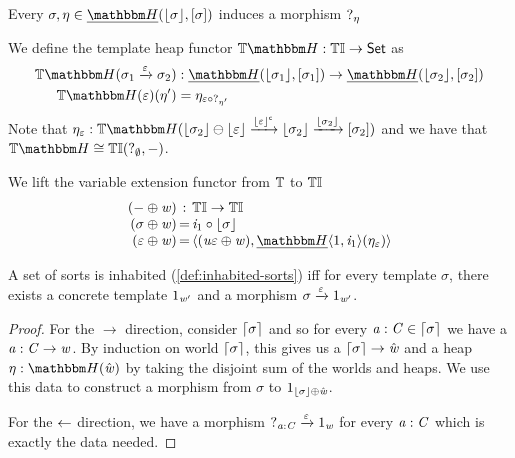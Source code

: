 \begin{remark}
    Every $\sigma, \mvarM \in \dheapF(\concL\sigma, \anyL\sigma)$ induces a morphism $?_\eta$
    \begin{center}
    \end{center}
\end{remark}

\begin{definition}
We define the template heap functor $\theapF : \tinstC \to \setC$ as
\begin{align*}
    \theapF(\sigma_1 \xto\me \sigma_2) &: \dheapF(\concL{\sigma_1}, \anyL{\sigma_1}) \to \dheapF(\concL{\sigma_2}, \anyL{\sigma_2}) \\
    \theapF(\me)(\mvarM') &= \mvarM_{\me \comp ?_{\mvarM'}}
\end{align*}
Note that $\mvarM_\me : \theapF(\concL{\sigma_2} \ominus \concL\me \xto{\compl{\concL{\me}}} \concL{\sigma_2} \xto{\concL{\sigma_2}} \anyL{\sigma_2})$ 
and we have that $\theapF \iso \homF\tinstC{?_\emptyset}\dash$.
\end{definition}

\begin{definition}
We lift the variable extension functor from $\mathbb{T}$ to ${\mathbb{T}\mathbb{I}}$
\[\begin{array}{r@{\,}c@{\,}l}
    \extF\dash\vw & : & \tinstC \to \tinstC \\
    \extF\sigma\vw & = & \incl_1 \comp \concL\sigma \\
    \extF\me\vw & = & \Pair{\extF{\tinstU\me}\vw}{\dheapF\pair1{\incl_1}(\mvarM_\me)}
\end{array}\]
\end{definition}

\begin{lemma}\label{def:inhabited-sorts-tinstC}
    A set of sorts is inhabited (\cref{def:inhabited-sorts}) iff
    for every template $\sigma$, there exists a concrete template $1_{\mathit{w}'}$ and a morphism $\sigma \xrightarrow{\varepsilon} 1_{\mathit{w}'}$.
\end{lemma}
\begin{proof}
    For the $\to$ direction, consider $\lceil\sigma\rceil$ and so for every $\mathit{a} : \mathit{C} \in \lceil\sigma\rceil$ we have a $\mathit{a} : \mathit{C} \to \mathit{w}$.
    By induction on world $\lceil\sigma\rceil$, this gives us a $\lceil\sigma\rceil \to \hat{\mathit{w}}$ and a heap $\mvarM : \heapF(\hat\vw)$ by taking the disjoint sum of the worlds and heaps.
    We use this data to construct a morphism from $\sigma$ to $1_{\lfloor\sigma\rfloor \oplus \hat{\mathit{w}}}$.

    For the $\leftarrow$ direction, we have a morphism $?_{\mathit{a} : \mathit{C}} \xrightarrow{\varepsilon} 1_{\mathit{w}}$ for every $\mathit{a} : \mathit{C}$ which is exactly the data needed.
\end{proof}


